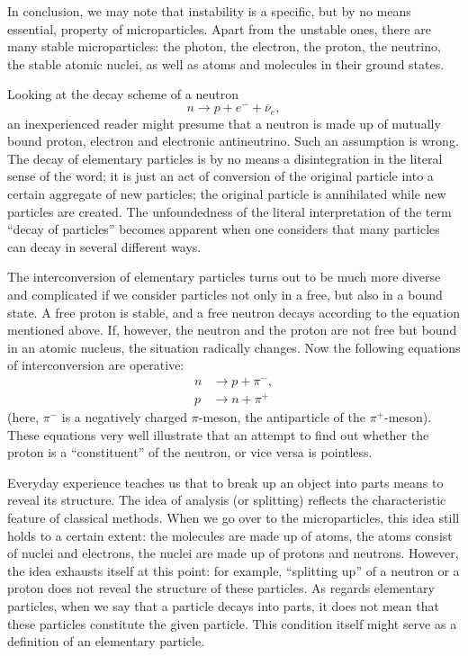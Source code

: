 \documentclass[a4paper,sfsidenotes,colorlinks=true]{tufte-book}
\numberwithin{equation}{section}
\numberwithin{figure}{section}
\begin{document}
In conclusion, we may note that instability is a specific, but by no
means essential, property of microparticles. Apart from the unstable
ones, there are many stable microparticles: the photon, the electron,
the proton, the neutrino, the stable atomic nuclei, as well as atoms
and molecules in their ground states.  

Looking at the decay scheme of a neutron 
\begin{equation*}
n \to  p + e^{-} + \overline{\nu}_{e}, 
\end{equation*}
an inexperienced reader might presume that a neutron is made up of
mutually bound proton, electron and electronic antineutrino. Such an
assumption is wrong. The decay of elementary particles is by no means
a disintegration in the literal sense of the word; it is just an act
of conversion of the original particle into a certain aggregate of new
particles; the original particle is annihilated while new particles
are created. The unfoundedness of the literal interpretation of the
term ``decay of particles'' becomes apparent when one considers that
many particles can decay in several different ways.  

The interconversion of elementary particles turns out to be much more
diverse and complicated if we consider particles not only in a free,
but also in a bound state. A free proton is stable, and a free neutron
decays according to the equation mentioned above. If, however, the
neutron and the proton are not free but bound in an atomic nucleus,
the situation radically changes. Now the following equations of
interconversion are operative: 
\begin{align*}
n &\to p + \pi^{-},\\
 p & \to n + \pi^{+} 
\end{align*}
(here, $\pi^{-}$ is a negatively charged $\pi$-meson, the antiparticle
of the $\pi^{+}$-meson). These equations very well illustrate that an
attempt to find out whether the proton is a ``constituent'' of the
neutron, or vice versa is pointless.  

Everyday experience teaches us that to break up an object into parts
means to reveal its structure. The idea of analysis (or splitting)
reflects the characteristic feature of classical methods. When we go
over to the microparticles, this idea still holds to a certain extent:
the molecules are made up of atoms, the atoms consist of nuclei and
electrons, the nuclei are made up of protons and neutrons. However,
the idea exhausts itself at this point: for example, ``splitting up'' of
a neutron or a proton does not reveal the structure of these
particles. As regards elementary particles, when we say that a
particle decays into parts, it does not mean that these particles
constitute the given particle. This condition itself might serve as a
definition of an elementary particle.  
\end{document}
